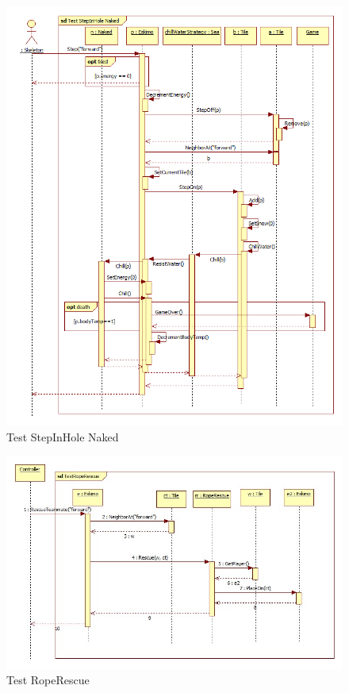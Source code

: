 \begin{figure}[H]
	\begin{center}
		\includegraphics[width=17cm]{chapters/chapter05/diagrams/Test_StepInHole_Naked.png}
		\caption{Test StepInHole Naked}
		\label{fig:Test StepInHole Naked}
	\end{center}
\end{figure}

\begin{figure}[H]
	\begin{center}
		\includegraphics[width=17cm]{chapters/chapter05/diagrams/Test_RopeRescue.jpg}
		\caption{Test RopeRescue}
		\label{fig:Test RopeRescue}
	\end{center}
\end{figure}

